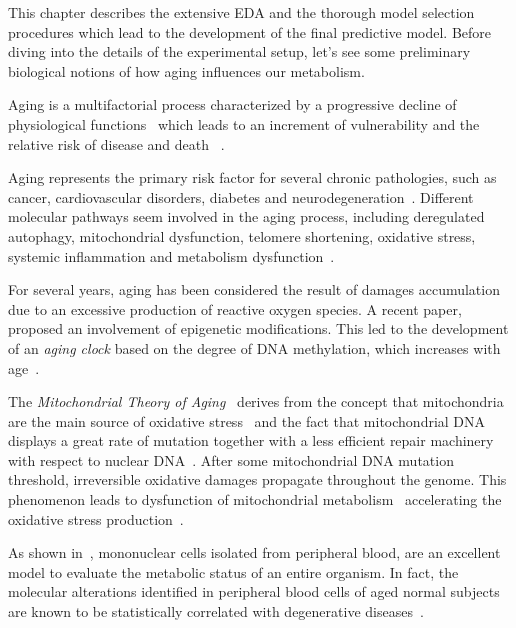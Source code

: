 This chapter describes the extensive EDA and the thorough model selection procedures which lead to the development of the final predictive model.
Before diving into the details of the experimental setup, let's see some preliminary biological notions of how aging influences our metabolism.

Aging is a multifactorial process characterized by a progressive decline of physiological functions~\cite{campisi2013aging} which leads to an increment of vulnerability and the relative risk of disease and death ~\cite{bratic2010mitochondrial}.

Aging represents the primary risk factor for several chronic pathologies, such as cancer, cardiovascular disorders, diabetes and neurodegeneration~\cite{lopez2013hallmarks}. Different molecular pathways seem involved in the aging process, including deregulated autophagy, mitochondrial dysfunction, telomere shortening, oxidative stress, systemic inflammation and metabolism dysfunction~\cite{lopez2013hallmarks, riera2016signaling}.

For several years, aging has been considered the result of damages accumulation due to an excessive production of reactive oxygen species.
A recent paper,  \cite{thompson2017epigenetic} proposed an involvement of epigenetic modifications. This led to the development of an \textit{aging clock} based on the degree of DNA methylation, which increases with age~\cite{horvath2013dna}. 

The \textit{Mitochondrial Theory of Aging}~\cite{harman1972biologic, sastre2000mitochondrial} derives from the  concept that mitochondria are the main source of oxidative stress~\cite{cadenas2000mitochondrial, turrens2003mitochondrial, dai2014mitochondrial} and the fact that mitochondrial DNA displays a
great rate of mutation together with a less efficient repair machinery with respect to nuclear DNA~\cite{short2005decline}. After some mitochondrial DNA mutation threshold, irreversible oxidative damages propagate throughout the genome. This phenomenon leads to dysfunction of mitochondrial metabolism~\cite{genova2004mitochondrial} accelerating the oxidative stress production~\cite{wallace2010mitochondrial}.

As shown in~\cite{mckerrell2015leukemia}, mononuclear cells isolated from peripheral blood, are an excellent model to evaluate the metabolic status of an entire organism. In fact, the molecular alterations identified in peripheral blood cells of aged normal subjects are known to be statistically correlated with degenerative diseases~\cite{jaiswal2014age}.


